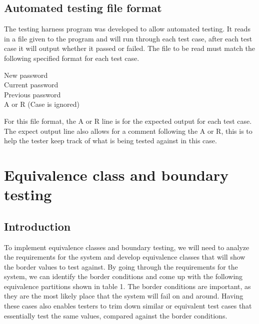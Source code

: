 \documentclass[12pt,letterpaper]{article}
\begin{document}
\subsection{Automated testing file format}

The testing harness program was developed to allow automated testing. It reads in a file given to the
program and will run through each test case, after each test case it will output whether it
passed or failed. The file to be read must match the following specified format for each test case.

\begin{center}
New password \\
Current password \\
Previous password \\
A or R (Case is ignored)
\end{center}

For this file format, the A or R line is for the expected output for each test case. The expect output
line also allows for a comment following the A or R, this is to help the tester keep track of
what is being tested against in this case.

\section{Equivalence class and boundary testing}

\subsection{Introduction}
To implement equivalence classes and boundary testing, we will need to analyze the requirements
for the system and develop equivalence classes that will show the border values to test against. By going through the requirements for the system, we can identify the border conditions and come up with the following equivalence partitions shown in table 1.
The border conditions are important, as they are the most likely place that the system will fail on and around.  Having these cases also enables testers to trim down similar or equivalent test cases that essentially test the same values, compared against the border conditions.
\end{document}
